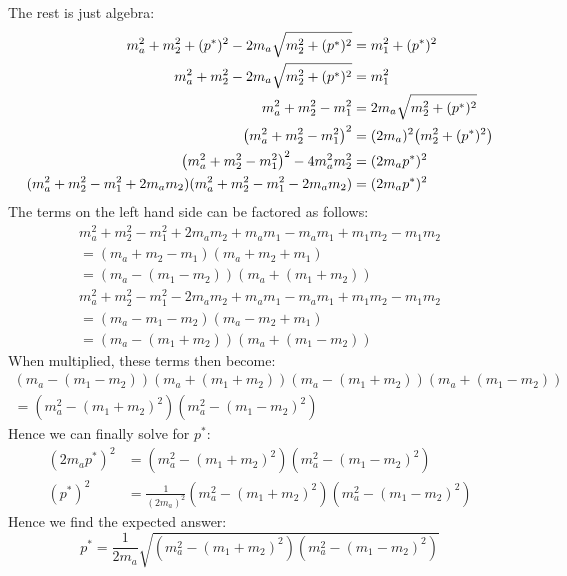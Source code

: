 \documentclass[12pt]{article}
\begin{document}
The rest is just algebra:
\begin{align*}
  m_a^2+m_2^2+(p^*)^2-2m_a\sqrt{m_2^2+(p^*)^2}&=m_1^2+(p^*)^2\\
  m_a^2+m_2^2-2m_a\sqrt{m_2^2+(p^*)^2}&=m_1^2\\
  m_a^2+m_2^2-m_1^2&=2m_a\sqrt{m_2^2+(p^*)^2}\\
  \qty(m_a^2+m_2^2-m_1^2)^2&=(2m_a)^2\qty(m_2^2+(p^*)^2)\\
  \qty(m_a^2+m_2^2-m_1^2)^2-4m_a^2m_2^2&=(2m_ap^*)^2\\
  (m_a^2+m_2^2-m_1^2+2m_am_2)(m_a^2+m_2^2-m_1^2-2m_am_2)&=(2m_ap^*)^2
\end{align*}
The terms on the left hand side can be factored as follows:
\begin{gather*}
  m_a^2+m_2^2-m_1^2+2m_am_2+m_am_1-m_am_1+m_1m_2-m_1m_2\\
  =(m_a+m_2-m_1)(m_a+m_2+m_1)\\
  =(m_a-(m_1-m_2))(m_a+(m_1+m_2))\\
  m_a^2+m_2^2-m_1^2-2m_am_2+m_am_1-m_am_1+m_1m_2-m_1m_2\\
  =(m_a-m_1-m_2)(m_a-m_2+m_1)\\
  =(m_a-(m_1+m_2))(m_a+(m_1-m_2))
\end{gather*}
When multiplied, these terms then become:
\begin{align*}
  (m_a-(m_1-m_2))(m_a+(m_1+m_2))(m_a-(m_1+m_2))(m_a+(m_1-m_2))\\
  =(m_a^2-(m_1+m_2)^2)(m_a^2-(m_1-m_2)^2)
\end{align*}
Hence we can finally solve for $p^*$:
\begin{align*}
  (2m_ap^*)^2&=(m_a^2-(m_1+m_2)^2)(m_a^2-(m_1-m_2)^2)\\
  (p^*)^2&=\frac1{(2m_a)^2}(m_a^2-(m_1+m_2)^2)(m_a^2-(m_1-m_2)^2)
\end{align*}
Hence we find the expected answer:
\begin{equation}
  \label{eq:p1}
  \boxed{p^*=\frac1{2m_a}\sqrt{(m_a^2-(m_1+m_2)^2)(m_a^2-(m_1-m_2)^2)}}
\end{equation}
\end{document}
